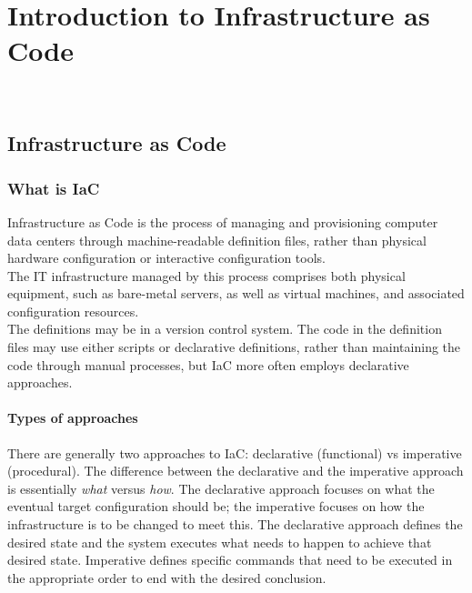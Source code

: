 
\chapter{Introduction to Infrastructure as Code}
\label{cap:introduction-to-iac}

\\

\section{Infrastructure as Code}

\subsection{What is IaC}

Infrastructure as Code is the process of managing and provisioning computer data centers through machine-readable definition files, rather than physical hardware configuration or interactive configuration tools. \\
The IT infrastructure managed by this process comprises both physical equipment, such as bare-metal servers, as well as virtual machines, and associated configuration resources. \\
The definitions may be in a version control system. The code in the definition files may use either scripts or declarative definitions, rather than maintaining the code through manual processes, but IaC more often employs declarative approaches. 

\subsubsection{Types of approaches}

There are generally two approaches to IaC: declarative (functional) vs imperative (procedural). The difference between the declarative and the imperative approach is essentially \textit{what} versus \textit{how}.
The declarative approach focuses on what the eventual target configuration should be; the imperative focuses on how the infrastructure is to be changed to meet this.
The declarative approach defines the desired state and the system executes what needs to happen to achieve that desired state.
Imperative defines specific commands that need to be executed in the appropriate order to end with the desired conclusion.

